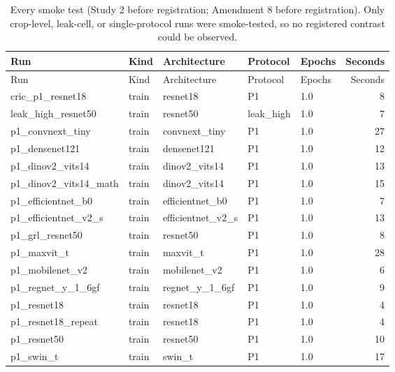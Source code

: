 {\scriptsize
\setlength{\tabcolsep}{3.5pt}
\begin{longtable}{p{5.2cm}llllr}
\caption{Every smoke test (Study 2 before registration; Amendment 8 before registration). Only crop-level, leak-cell, or single-protocol runs were smoke-tested, so no registered contrast could be observed.}\label{r:tab:ledger-smoke}\\
\toprule
Run & Kind & Architecture & Protocol & Epochs & Seconds \\
\midrule
\endfirsthead
\toprule
Run & Kind & Architecture & Protocol & Epochs & Seconds \\
\midrule
\endhead
\bottomrule
\endfoot
cric\_\allowbreak{}p1\_\allowbreak{}resnet18 & train & resnet18 & P1 & 1.0 & 8 \\
leak\_\allowbreak{}high\_\allowbreak{}resnet50 & train & resnet50 & leak\_high & 1.0 & 7 \\
p1\_\allowbreak{}convnext\_\allowbreak{}tiny & train & convnext\_tiny & P1 & 1.0 & 27 \\
p1\_\allowbreak{}densenet121 & train & densenet121 & P1 & 1.0 & 12 \\
p1\_\allowbreak{}dinov2\_\allowbreak{}vits14 & train & dinov2\_vits14 & P1 & 1.0 & 13 \\
p1\_\allowbreak{}dinov2\_\allowbreak{}vits14\_\allowbreak{}math & train & dinov2\_vits14 & P1 & 1.0 & 15 \\
p1\_\allowbreak{}efficientnet\_\allowbreak{}b0 & train & efficientnet\_b0 & P1 & 1.0 & 7 \\
p1\_\allowbreak{}efficientnet\_\allowbreak{}v2\_\allowbreak{}s & train & efficientnet\_v2\_s & P1 & 1.0 & 13 \\
p1\_\allowbreak{}grl\_\allowbreak{}resnet50 & train & resnet50 & P1 & 1.0 & 8 \\
p1\_\allowbreak{}maxvit\_\allowbreak{}t & train & maxvit\_t & P1 & 1.0 & 28 \\
p1\_\allowbreak{}mobilenet\_\allowbreak{}v2 & train & mobilenet\_v2 & P1 & 1.0 & 6 \\
p1\_\allowbreak{}regnet\_\allowbreak{}y\_\allowbreak{}1\_\allowbreak{}6gf & train & regnet\_y\_1\_6gf & P1 & 1.0 & 9 \\
p1\_\allowbreak{}resnet18 & train & resnet18 & P1 & 1.0 & 4 \\
p1\_\allowbreak{}resnet18\_\allowbreak{}repeat & train & resnet18 & P1 & 1.0 & 4 \\
p1\_\allowbreak{}resnet50 & train & resnet50 & P1 & 1.0 & 10 \\
p1\_\allowbreak{}swin\_\allowbreak{}t & train & swin\_t & P1 & 1.0 & 17 \\

\end{longtable}}
